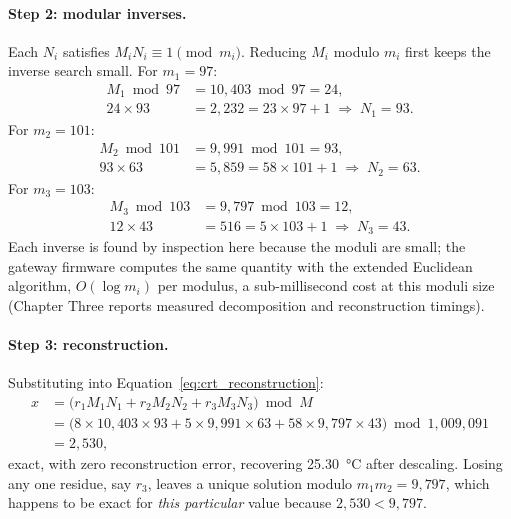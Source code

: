 \documentclass[12pt,a4paper,oneside]{book}
\begin{document}
\paragraph{Step 2: modular inverses.} Each $N_i$ satisfies
$M_i N_i \equiv 1 \pmod{m_i}$. Reducing $M_i$ modulo $m_i$ first keeps the
inverse search small. For $m_1 = 97$:
\begin{align*}
M_1 \bmod 97 &= 10{,}403 \bmod 97 = 24, \\
24 \times 93 &= 2{,}232 = 23 \times 97 + 1
  \;\Rightarrow\; N_1 = 93.
\end{align*}
For $m_2 = 101$:
\begin{align*}
M_2 \bmod 101 &= 9{,}991 \bmod 101 = 93, \\
93 \times 63 &= 5{,}859 = 58 \times 101 + 1
  \;\Rightarrow\; N_2 = 63.
\end{align*}
For $m_3 = 103$:
\begin{align*}
M_3 \bmod 103 &= 9{,}797 \bmod 103 = 12, \\
12 \times 43 &= 516 = 5 \times 103 + 1
  \;\Rightarrow\; N_3 = 43.
\end{align*}
Each inverse is found by inspection here because the moduli are small; the
gateway firmware computes the same quantity with the extended Euclidean
algorithm, $O(\log m_i)$ per modulus, a sub-millisecond cost at this
moduli size (Chapter Three reports measured decomposition and
reconstruction timings).

\paragraph{Step 3: reconstruction.} Substituting into
Equation~\ref{eq:crt_reconstruction}:
\begin{align*}
x &= \bigl( r_1 M_1 N_1 + r_2 M_2 N_2 + r_3 M_3 N_3 \bigr) \bmod M \\
  &= \bigl( 8 \times 10{,}403 \times 93 + 5 \times 9{,}991 \times 63
           + 58 \times 9{,}797 \times 43 \bigr) \bmod 1{,}009{,}091 \\
  &= 2{,}530,
\end{align*}
exact, with zero reconstruction error, recovering \SI{25.30}{\celsius}
after descaling. Losing any one residue, say $r_3$, leaves a unique
solution modulo $m_1 m_2 = 9{,}797$, which happens to be exact for
\emph{this particular} value because $2{,}530 < 9{,}797$.
\end{document}
